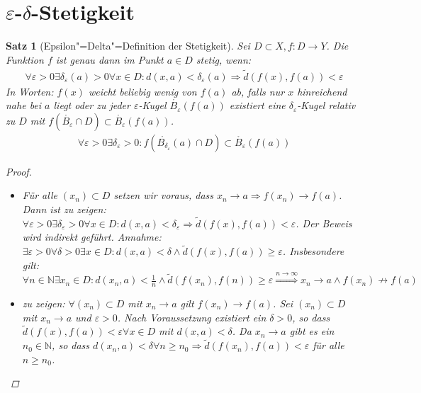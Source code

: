 \documentclass[ngerman,titlepage,twoside, parskip=half*]{scrreprt}
\newcommand*{\N}{\mathbb{N}}
\theoremstyle{break}
\newtheorem{theorem}{Satz}[section]
\theoremstyle{nonumberbreak}
\newtheorem{proof}{Beweis:}
\begin{document}
\section{\texorpdfstring{$\varepsilon$-$\delta$}{Epsilon-Delta}-Stetigkeit}
\begin{theorem}[Epsilon"=Delta"=Definition der Stetigkeit]\label{satz:e-d-stetig}
  Sei $D\subset X, f\colon D\rightarrow Y$. Die Funktion $f$ ist genau dann im
  Punkt $a\in D$ stetig, wenn:
  \begin{gather*}
    \forall \varepsilon >0 \exists \delta_{\varepsilon}(a)>0 \forall x \in
       D\colon d(x,a)<\delta_{\varepsilon} (a)\Rightarrow
       \tilde{d}(f(x),f(a))<\varepsilon
  \end{gather*}
  In Worten: $f(x)$ weicht beliebig wenig von $f(a)$ ab, falls nur $x$
  hinreichend nahe bei $a$ liegt oder zu jeder $\varepsilon$-Kugel
  $\mathring{B_{\varepsilon}}(f(a))$ existiert eine
  $\delta_{\varepsilon}$-Kugel relativ zu $D$ mit
  $f(\mathring{B_{\varepsilon}}\cap D)\subset \mathring{B_{\varepsilon}}
  (f(a))$.
  \begin{gather*}
    \forall \varepsilon >0 \exists \delta_{\varepsilon}>0\colon
       f(\mathring{B_{\delta_{\varepsilon}}}(a) \cap D) \subset
       \mathring{B_{\varepsilon}}(f(a))
  \end{gather*}
  \begin{proof}
    \begin{itemize}
  \item["`$\Rightarrow$"'] Für alle $(x_n)\subset D$ setzen wir voraus, dass
      $x_n\rightarrow a \Rightarrow f(x_n)\rightarrow f(a)$. Dann  ist
    zu zeigen: $\forall \varepsilon >0 \exists \delta_{\varepsilon} >0 \forall
      x \in D\colon d(x,a)< \delta_{\varepsilon}\Rightarrow
      \tilde{d}(f(x),f(a))<\varepsilon$.
    Der Beweis wird indirekt geführt. Annahme: $\exists \varepsilon >0 \forall
      \delta >0 \exists x \in D\colon d(x,a)<\delta \wedge \tilde{d}
      (f(x),f(a))\geq \varepsilon$.
    Insbesondere gilt: $\forall n \in \N \exists x_n \in D\colon d(x_n,a)<\frac{1}{n} \wedge \tilde{d}(f(x_n),
    f(n))\geq \varepsilon \stackrel{n\rightarrow \infty}{\Longrightarrow} x_n \rightarrow a \wedge 
    f(x_n)\not\rightarrow f(a)$
   \lightning
  \item["`$\Leftarrow$"'] zu zeigen: $\forall (x_n) \subset D$ mit
      $x_n\rightarrow a$ gilt $f(x_n) \rightarrow f(a)$.
    Sei $(x_n)\subset D$ mit $x_n\rightarrow a$ und $\varepsilon >0$. Nach
      Voraussetzung existiert ein $\delta >0$, so dass
      $\tilde{d}(f(x),f(a))<\varepsilon \forall x \in D$ mit $d(x,a)<\delta$.
      Da $x_n\rightarrow a$ gibt es ein $n_0\in \N$, so dass $d(x_n,a)<\delta
      \forall n\geq n_0 \Rightarrow \tilde{d}(f(x_n),f(a))<\varepsilon$ für
      alle $n\geq n_0$.
\end{itemize}
  \end{proof}
\end{theorem}
\end{document}
